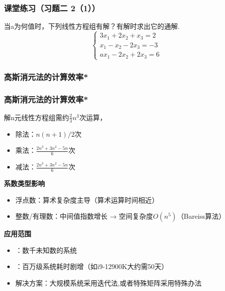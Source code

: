 \begin{frame}\frametitle{课堂练习（习题二 2（1））}
\begin{example}
当a为何值时，下列线性方程组有解？有解时求出它的通解.
\[\left\{\begin{array}{l}
3x_1 + 2x_2 + x_3 = 2 \\
x_1 - x_2 - 2x_3 = -3 \\
ax_1 - 2x_2 + 2x_3 = 6
\end{array}\right.\]
\end{example}
\end{frame}


\subsubsection{高斯消元法的计算效率*}
\begin{frame}\frametitle{高斯消元法的计算效率*}

解n元线性方程组需约$\frac{2}{3}n^3$次运算，
\begin{itemize}
\item 除法：$n(n+1)/2$次
\item 乘法：$\frac{2n^3+3n^2-5n}{6}$次
\item 减法：$\frac{2n^3+3n^2-5n}{6}$次
\end{itemize}

\pp
\bigskip

\textbf{系数类型影响}
\begin{itemize}
\item 浮点数：算术复杂度主导（算术运算时间相近）
\pp
\item 整数/有理数：中间值指数增长 → 空间复杂度$O(n^5)$（Bareiss算法）
\end{itemize}

\pp
\bigskip

\textbf{应用范围}
\begin{itemize}
\item {}：数千未知数的系统
\pp
\item {}：百万级系统耗时剧增（如i9-12900K大约需50天）
\pp
\item 解决方案：大规模系统采用迭代法,或者特殊矩阵采用特殊办法
\end{itemize}
\end{frame}



